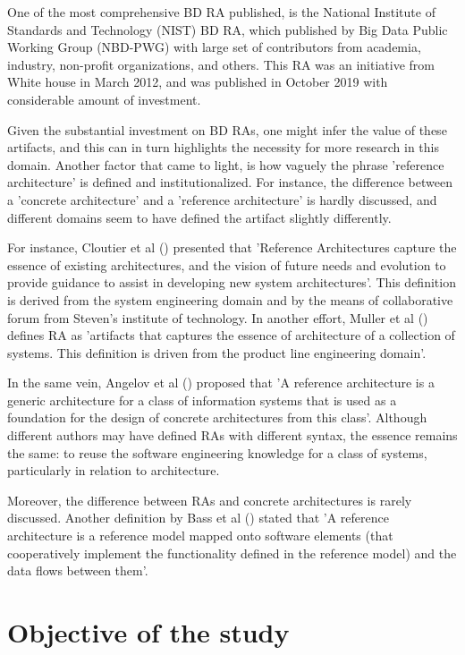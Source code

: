 \documentclass{ieeeaccess}
\begin{document}
 One of the most comprehensive BD RA published, is the National Institute of Standards and Technology (NIST) BD RA, which published by Big Data Public Working Group (NBD-PWG) with large set of contributors from academia, industry, non-profit organizations, and others. This RA was an initiative from White house in March 2012, and was published in October 2019 with considerable amount of investment. 

Given the substantial investment on BD RAs, one might infer the value of these artifacts, and this can in turn highlights the necessity for more research in this domain. Another factor that came to light, is how vaguely the phrase 'reference architecture' is defined and institutionalized. For instance, the difference between a 'concrete architecture' and a 'reference architecture' is hardly discussed, and different domains seem to have defined the artifact slightly differently. 

For instance, Cloutier et al (\cite{Cloutier}) presented that 'Reference Architectures capture the essence of existing architectures, and the vision of future needs and evolution to provide guidance to assist in developing new system architectures'. This definition is derived from the system engineering domain and by the means of collaborative forum from Steven's institute of technology. In another effort, Muller et al (\cite{muller2008reference}) defines RA as 'artifacts that captures the essence of architecture of a collection of systems. This definition is driven from the product line engineering domain'. 

In the same vein, Angelov et al (\cite{angelov2009classification}) proposed that 'A reference architecture is a generic architecture for a class of information systems that is used as a foundation for the design of concrete architectures from this class'. Although different authors may have defined RAs with different syntax, the essence remains the same: to reuse the software engineering knowledge for a class of systems, particularly in relation to architecture. 

Moreover, the difference between RAs and concrete architectures is rarely discussed. Another definition by Bass et al (\cite{Bass}) stated that 'A reference architecture is a reference model mapped onto software elements (that cooperatively implement the functionality defined in the reference model) and the data flows between them'. 



\section{Objective of the study}
\end{document}

